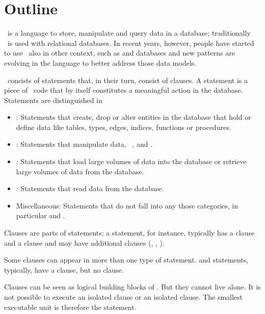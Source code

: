 \section{Outline}
\sql\ is a language to store, manipulate
and query data in a database; traditionally
\sql\ is used with relational databases.
In recent years, however, people have
started to use \sql\ also in other context,
such as  and 
databases and new patterns are evolving
in the language to better address those
data models.

\sql\ consists of statements that,
in their turn, consist of clauses.
A statement is a piece of \sql\ code
that by itself constitutes a meaningful
action in the database. Statements are
distinguished in

\begin{itemize}
\item {}:
Statements that create, drop or alter entities
in the database that hold or define
data
like tables, types, edges, indices,
functions or procedures.

\item {}:
Statements that manipulate data,
\eg\ ,  and
.

\item {}:
Statements that load large volumes of data into the database
or retrieve large volumes of data from the database.

\item {}:
Statements that read data from the database.

\item Miscellaneous:
Statements that do not fall into any
those categories, in particular
 and .
\end{itemize}

Clauses are parts of statements;
a  statement, for instance,
typically has a  clause and
a  clause and may have
additional clauses (,
, \etc).

Some clauses can appear in more than
one type of statement. 
and  statements, typically,
have a  clause, but no
 clause.

Clauses can be seen as logical building blocks
of \sql. But they cannot live alone.
It is not possible to execute an isolated 
clause or an isolated  clause.
The smallest executable unit is therefore the statement.

